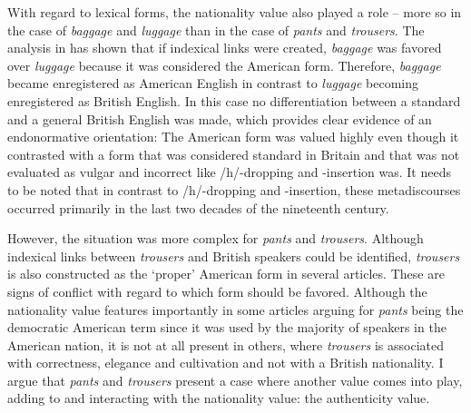 With regard to lexical forms, the nationality value also played a role – more so in the case of \emph{baggage} and \emph{luggage} than in the case of \emph{pants} and \emph{trousers}. The analysis in  has shown that if indexical links were created, \emph{baggage} was favored over \emph{luggage} because it was considered the American form. Therefore, \emph{baggage} became enregistered as American English in contrast to \emph{luggage} becoming enregistered as British English. In this case no differentiation between a standard and a general British English was made, which provides clear evidence of an endonormative orientation: The American form was valued highly even though it contrasted with a form that was considered standard in Britain and that was not evaluated as vulgar and incorrect like /h/-dropping and -insertion was. It needs to be noted that in contrast to /h/-dropping and -insertion, these metadiscourses occurred primarily in the last two decades of the nineteenth century.

However, the situation was more complex for \emph{pants} and \emph{trousers}. Although indexical links between \emph{trousers} and British speakers could be identified, \emph{trousers} is also constructed as the ‘proper’ American form in several articles. These are signs of conflict with regard to which form should be favored. Although the nationality value features importantly in some articles arguing for \emph{pants} being the democratic American term since it was used by the majority of speakers in the American nation, it is not at all present in others, where \emph{trousers} is associated with correctness, elegance and cultivation and not with a British nationality. I argue that \emph{pants} and \emph{trousers} present a case where another value comes into play, adding to and interacting with the nationality value: the authenticity value.

